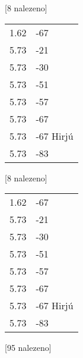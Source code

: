 \begin{table}[H]
\begin{tt}

\horizlina

\noindent
\begin{minipage}[t]{.5\textwidth}\vspace{0pt}
 [8 nalezeno]\vspace{5pt}

\begin{tabulary}{1.1\textwidth}{LL}
1.62 &  -67 \\
5.73 &  -21 \\
5.73 &  -30 \\
5.73 &  -51 \\
5.73 &  -57 \\
5.73 &  -67 \\
5.73 &  -67 Hirjú \\
5.73 &  -83 \\
\end{tabulary}
\end{minipage}
\begin{minipage}[t]{.5\textwidth}\vspace{0pt}
 [8 nalezeno]\vspace{5pt}

\begin{tabulary}{1.1\textwidth}{LL}
1.62 &  -67 \\
5.73 &  -21 \\
5.73 &  -30 \\
5.73 &  -51 \\
5.73 &  -57 \\
5.73 &  -67 \\
5.73 &  -67 Hirjú \\
5.73 &  -83 \\
\end{tabulary}

\end{minipage}

\horizlina

\noindent
\begin{minipage}[t]{.5\textwidth}\vspace{0pt}
 [95 nalezeno]\vspace{5pt}


\end{minipage}
\end{tt}
\end{table}
